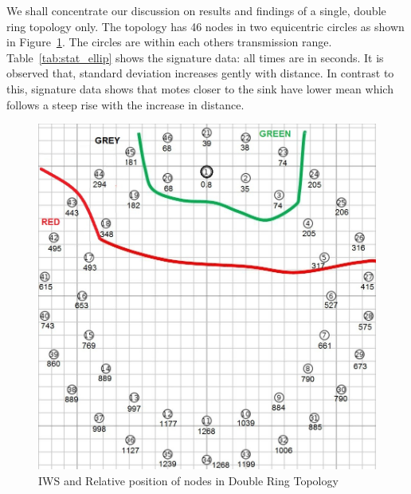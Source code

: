 \documentclass[conference]{IEEEtran}
\begin{document}
We shall concentrate our discussion on results and findings of a single, double ring topology only.
The topology has 46 nodes in two equicentric circles as shown  in Figure~\ref{fig:elliptopo}.
The circles are within each others transmission range.
Table~\ref{tab:stat_ellip} shows the signature data: all times are in seconds.
It is observed that, standard deviation increases gently with distance.
In contrast to this, %
signature data shows that motes closer to the sink have lower mean which follows a steep rise with the increase in distance.


\begin{figure}[t]
    \centering
        \includegraphics[width=\linewidth]{DoubleRingZ}
        \caption{IWS and Relative position of nodes in Double Ring Topology}
        \label{fig:elliptopo} 
    \end{figure}
\end{document}
